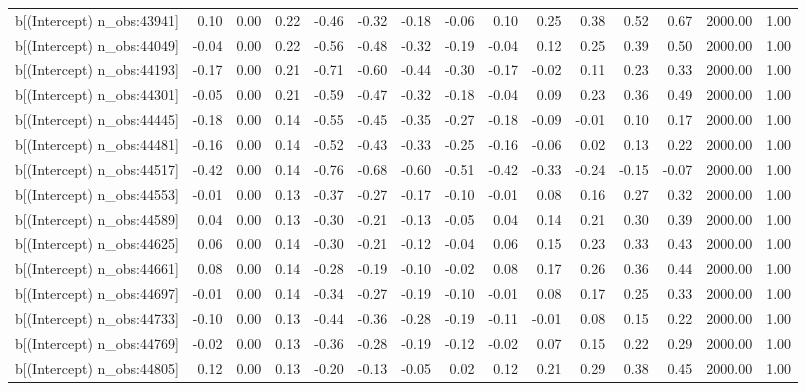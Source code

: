 \begin{table}[ht]
\begin{tabular}{rrrrrrrrrrrrrrr}
  b[(Intercept) n\_obs:43941] & 0.10 & 0.00 & 0.22 & -0.46 & -0.32 & -0.18 & -0.06 & 0.10 & 0.25 & 0.38 & 0.52 & 0.67 & 2000.00 & 1.00 \\ 
  b[(Intercept) n\_obs:44049] & -0.04 & 0.00 & 0.22 & -0.56 & -0.48 & -0.32 & -0.19 & -0.04 & 0.12 & 0.25 & 0.39 & 0.50 & 2000.00 & 1.00 \\ 
  b[(Intercept) n\_obs:44193] & -0.17 & 0.00 & 0.21 & -0.71 & -0.60 & -0.44 & -0.30 & -0.17 & -0.02 & 0.11 & 0.23 & 0.33 & 2000.00 & 1.00 \\ 
  b[(Intercept) n\_obs:44301] & -0.05 & 0.00 & 0.21 & -0.59 & -0.47 & -0.32 & -0.18 & -0.04 & 0.09 & 0.23 & 0.36 & 0.49 & 2000.00 & 1.00 \\ 
  b[(Intercept) n\_obs:44445] & -0.18 & 0.00 & 0.14 & -0.55 & -0.45 & -0.35 & -0.27 & -0.18 & -0.09 & -0.01 & 0.10 & 0.17 & 2000.00 & 1.00 \\ 
  b[(Intercept) n\_obs:44481] & -0.16 & 0.00 & 0.14 & -0.52 & -0.43 & -0.33 & -0.25 & -0.16 & -0.06 & 0.02 & 0.13 & 0.22 & 2000.00 & 1.00 \\ 
  b[(Intercept) n\_obs:44517] & -0.42 & 0.00 & 0.14 & -0.76 & -0.68 & -0.60 & -0.51 & -0.42 & -0.33 & -0.24 & -0.15 & -0.07 & 2000.00 & 1.00 \\ 
  b[(Intercept) n\_obs:44553] & -0.01 & 0.00 & 0.13 & -0.37 & -0.27 & -0.17 & -0.10 & -0.01 & 0.08 & 0.16 & 0.27 & 0.32 & 2000.00 & 1.00 \\ 
  b[(Intercept) n\_obs:44589] & 0.04 & 0.00 & 0.13 & -0.30 & -0.21 & -0.13 & -0.05 & 0.04 & 0.14 & 0.21 & 0.30 & 0.39 & 2000.00 & 1.00 \\ 
  b[(Intercept) n\_obs:44625] & 0.06 & 0.00 & 0.14 & -0.30 & -0.21 & -0.12 & -0.04 & 0.06 & 0.15 & 0.23 & 0.33 & 0.43 & 2000.00 & 1.00 \\ 
  b[(Intercept) n\_obs:44661] & 0.08 & 0.00 & 0.14 & -0.28 & -0.19 & -0.10 & -0.02 & 0.08 & 0.17 & 0.26 & 0.36 & 0.44 & 2000.00 & 1.00 \\ 
  b[(Intercept) n\_obs:44697] & -0.01 & 0.00 & 0.14 & -0.34 & -0.27 & -0.19 & -0.10 & -0.01 & 0.08 & 0.17 & 0.25 & 0.33 & 2000.00 & 1.00 \\ 
  b[(Intercept) n\_obs:44733] & -0.10 & 0.00 & 0.13 & -0.44 & -0.36 & -0.28 & -0.19 & -0.11 & -0.01 & 0.08 & 0.15 & 0.22 & 2000.00 & 1.00 \\ 
  b[(Intercept) n\_obs:44769] & -0.02 & 0.00 & 0.13 & -0.36 & -0.28 & -0.19 & -0.12 & -0.02 & 0.07 & 0.15 & 0.22 & 0.29 & 2000.00 & 1.00 \\ 
  b[(Intercept) n\_obs:44805] & 0.12 & 0.00 & 0.13 & -0.20 & -0.13 & -0.05 & 0.02 & 0.12 & 0.21 & 0.29 & 0.38 & 0.45 & 2000.00 & 1.00 \\ 

\end{tabular}
\end{table}
